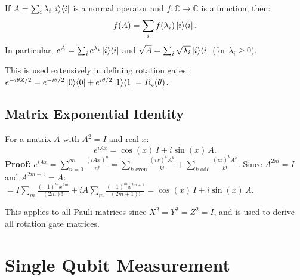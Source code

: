 \documentclass[10pt,a4paper]{article}
\begin{document}
\begin{tcolorbox}[defstyle, title={Definition: Function of a Normal Operator}]
If $A=\sum_i\lambda_i\ket{i}\!\bra{i}$ is a normal operator and $f:\mathbb{C}\to\mathbb{C}$ is a function, then:
\[
f(A)=\sum_i f(\lambda_i)\ket{i}\!\bra{i}.
\]
In particular, $e^A=\sum_i e^{\lambda_i}\ket{i}\!\bra{i}$ and $\sqrt{A}=\sum_i\sqrt{\lambda_i}\ket{i}\!\bra{i}$ (for $\lambda_i\ge 0$).
\end{tcolorbox}

This is used extensively in defining rotation gates: $e^{-i\theta Z/2}=e^{-i\theta/2}\ket{0}\!\bra{0}+e^{i\theta/2}\ket{1}\!\bra{1}=R_z(\theta)$.

\subsection{Matrix Exponential Identity}

\begin{tcolorbox}[propstyle, title={Proposition: Matrix Exponential for $A^2=I$}]
For a matrix $A$ with $A^2=I$ and real $x$:
\[
e^{iAx}=\cos(x)\,I+i\sin(x)\,A.
\]
\textbf{Proof:} $e^{iAx}=\sum_{n=0}^\infty\frac{(iAx)^n}{n!}=\sum_{k\text{ even}}\frac{(ix)^k A^k}{k!}+\sum_{k\text{ odd}}\frac{(ix)^k A^k}{k!}$. Since $A^{2m}=I$ and $A^{2m+1}=A$:
$=I\sum_{m}\frac{(-1)^m x^{2m}}{(2m)!}+iA\sum_{m}\frac{(-1)^m x^{2m+1}}{(2m+1)!}=\cos(x)\,I+i\sin(x)\,A$.
\end{tcolorbox}

This applies to all Pauli matrices since $X^2=Y^2=Z^2=I$, and is used to derive all rotation gate matrices.

\newpage
\section{Single Qubit Measurement}
\end{document}
